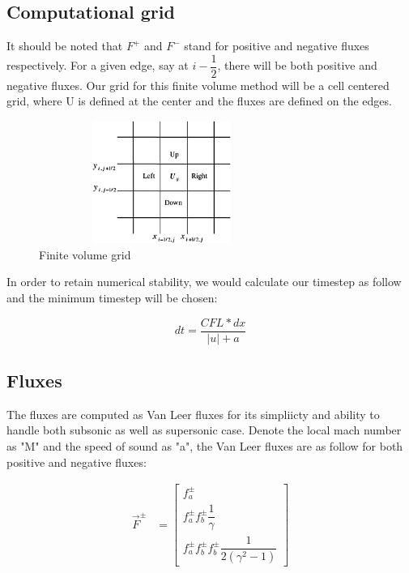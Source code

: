 \documentclass[12pt]{article}
\begin{document}
    \subsection{Computational grid}
    \noindent
    It should be noted that $F^+$ and $F^-$ stand for positive and negative fluxes respectively.  For a given edge, say at $i-\dfrac{1}{2}$, there will be both positive and negative fluxes.  
    \noindent \newline
    Our grid for this finite volume method will be a cell centered grid, where U is defined at the center and the fluxes are defined on the edges. 

    \begin{figure}[H]
        \begin{center}
        \includegraphics[height = 40mm,width = 80mm]{grid.png}
        \caption{Finite volume grid}
        \end{center}
    \end{figure}

    \noindent
    In order to retain numerical stability, we would calculate our timestep as follow and the minimum timestep will be chosen: 

    \begin{equation}
        dt = \dfrac{CFL*dx}{|u|+a}
    \end{equation}

    \noindent
    \subsection{Fluxes}
    The fluxes are computed as Van Leer fluxes for its simpliicty and ability to handle both subsonic as well as supersonic case. Denote the local mach number as "M" and the speed of sound as "a", the Van Leer fluxes are as follow for both positive and negative fluxes: 


    \begin{align}
        \vec{F}^{\pm} &= \begin{bmatrix}
               f_a^{\pm} \\
               f_a^{\pm}f_b^{\pm}\dfrac{1}{\gamma} \\
               f_a^{\pm}f_b^{\pm}f_b^{\pm} \dfrac{1}{2(\gamma^2-1)}
             \end{bmatrix}
      \end{align}
\end{document}
